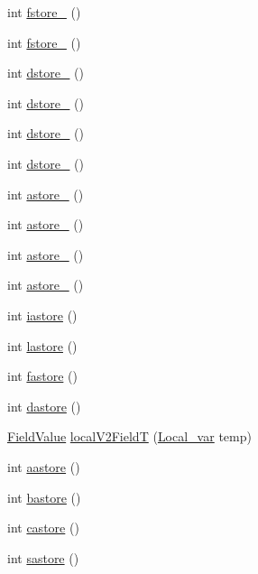 \begin{DoxyCompactItemize}
\item 
int \hyperlink{classInterpretador_a2f35a4eb9008338802821dc036430400}{fstore\+\_} ()
\item 
int \hyperlink{classInterpretador_ab4a1db8e3486a5e2a6557f63b89dff59}{fstore\+\_} ()
\item 
int \hyperlink{classInterpretador_ac262dca0e876fdc602235daca53fff8f}{dstore\+\_} ()
\item 
int \hyperlink{classInterpretador_a15703e13cc6cd2e13be3f4bffdd2956c}{dstore\+\_} ()
\item 
int \hyperlink{classInterpretador_a28b0d485bb7ff36977c26c1c0f5a4a82}{dstore\+\_} ()
\item 
int \hyperlink{classInterpretador_a1169468a7e2a242b816157b00009e931}{dstore\+\_} ()
\item 
int \hyperlink{classInterpretador_a506b3b3a20cf51cc6cc27bd58d19ad37}{astore\+\_} ()
\item 
int \hyperlink{classInterpretador_afe0a547fcec1a2a78b61767ff08b43cc}{astore\+\_} ()
\item 
int \hyperlink{classInterpretador_ad9f2214a9d6dee2f29cd88e4a4187a00}{astore\+\_} ()
\item 
int \hyperlink{classInterpretador_aeee2245c2a98dfe5e48a03eb78b60187}{astore\+\_} ()
\item 
int \hyperlink{classInterpretador_ae9fd7c95651bf3c1913978a56cad28c1}{iastore} ()
\item 
int \hyperlink{classInterpretador_af4e3baaa481ed006b46eeaaa3dc844e1}{lastore} ()
\item 
int \hyperlink{classInterpretador_ad6cec328242ed42fe967b7480aad33fe}{fastore} ()
\item 
int \hyperlink{classInterpretador_af9c8a69199cf11667302574cadbbb86c}{dastore} ()
\item 
\hyperlink{classFieldValue}{Field\+Value} \hyperlink{classInterpretador_a6cb026e710d97b2d2861f0ffe39341ea}{local\+V2\+Field\+T} (\hyperlink{classLocal__var}{Local\+\_\+var} temp)
\item 
int \hyperlink{classInterpretador_aa4c16d2455781d9ec884ee23e8e6311c}{aastore} ()
\item 
int \hyperlink{classInterpretador_a5b0c614543d662cd81dd754f21ccd3aa}{bastore} ()
\item 
int \hyperlink{classInterpretador_a2c4715f0705d200e1f5873e0a18bba36}{castore} ()
\item 
int \hyperlink{classInterpretador_a85517a700df4af40fb47536afb184890}{sastore} ()
\item 

\end{DoxyCompactItemize}
